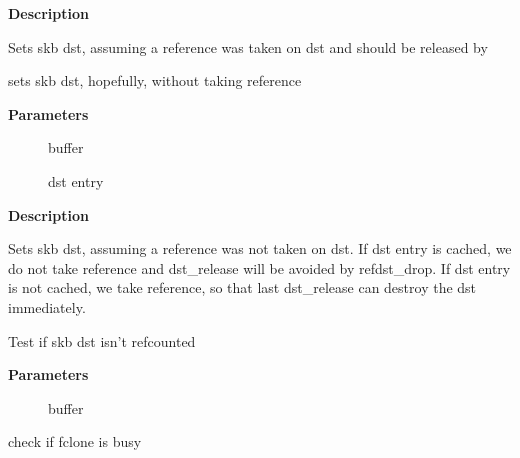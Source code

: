\documentclass[a4paper,8pt,english]{sphinxmanual}
\begin{document}
\textbf{Description}

Sets skb dst, assuming a reference was taken on dst and should
be released by 

\begin{fulllineitems}
\label{networking/kapi:c.skb_dst_set_noref}
sets skb dst, hopefully, without taking reference

\end{fulllineitems}


\textbf{Parameters}
\begin{description}
\item[{}] \leavevmode
buffer

\item[{}] \leavevmode
dst entry

\end{description}

\textbf{Description}

Sets skb dst, assuming a reference was not taken on dst.
If dst entry is cached, we do not take reference and dst\_release
will be avoided by refdst\_drop. If dst entry is not cached, we take
reference, so that last dst\_release can destroy the dst immediately.

\begin{fulllineitems}
\label{networking/kapi:c.skb_dst_is_noref}
Test if skb dst isn't refcounted

\end{fulllineitems}


\textbf{Parameters}
\begin{description}
\item[{}] \leavevmode
buffer

\end{description}

\begin{fulllineitems}
\label{networking/kapi:c.skb_fclone_busy}
check if fclone is busy

\end{fulllineitems}
\end{document}
